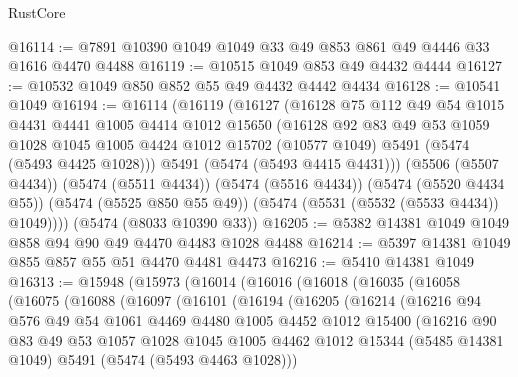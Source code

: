 \begin{lexlean}{RustCore}
\begin{coremodule}
@16114 := @7891 @10390 @1049 @1049 @33 @49 @853 @861 @49 @4446 @33 @1616 @4470 @4488
@16119 := @10515 @1049 @853 @49 @4432 @4444
@16127 := @10532 @1049 @850 @852 @55 @49 @4432 @4442 @4434
@16128 := @10541 @1049
@16194 := @16114
    (@16119
      (@16127
        (@16128
          @75
          @112
          @49
          @54
          @1015
          @4431
          @4441
          @1005
          @4414
          @1012
          @15650
          (@16128
            @92
            @83
            @49
            @53
            @1059
            @1028
            @1045
            @1005
            @4424
            @1012
            @15702
            (@10577 @1049)
            @5491
            (@5474 (@5493 @4425 @1028)))
          @5491
          (@5474 (@5493 @4415 @4431)))
        (@5506 (@5507 @4434))
        (@5474 (@5511 @4434))
        (@5474 (@5516 @4434))
        (@5474 (@5520 @4434 @55))
        (@5474 (@5525 @850 @55 @49))
        (@5474 (@5531 (@5532 (@5533 @4434)) @1049))))
    (@5474 (@8033 @10390 @33))
@16205 := @5382 @14381 @1049 @1049 @858 @94 @90 @49 @4470 @4483 @1028 @4488
@16214 := @5397 @14381 @1049 @855 @857 @55 @51 @4470 @4481 @4473
@16216 := @5410 @14381 @1049
@16313 := @15948
    (@15973
      (@16014
        (@16016
          (@16018
            (@16035
              (@16058
                (@16075
                  (@16088
                    (@16097
                      (@16101
                        (@16194
                          (@16205
                            (@16214
                              (@16216
                                @94
                                @576
                                @49
                                @54
                                @1061
                                @4469
                                @4480
                                @1005
                                @4452
                                @1012
                                @15400
                                (@16216
                                  @90
                                  @83
                                  @49
                                  @53
                                  @1057
                                  @1028
                                  @1045
                                  @1005
                                  @4462
                                  @1012
                                  @15344
                                  (@5485 @14381 @1049)
                                  @5491
                                  (@5474 (@5493 @4463 @1028)))

\end{coremodule}
\end{lexlean}
